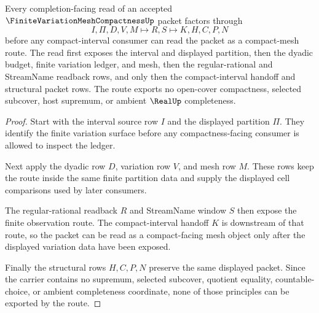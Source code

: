 \begin{theorem}
\label{thm:finite-variation-mesh-compactness-l10-route}
Every completion-facing read of an accepted $\FiniteVariationMeshCompactnessUp$ packet factors through
$$
I,\Pi,D,V,M \longmapsto R,S \longmapsto K,H,C,P,N
$$
before any compact-interval consumer can read the packet as a compact-mesh route. The read first exposes the interval and displayed partition, then the dyadic budget, finite variation ledger, and mesh, then the regular-rational and StreamName readback rows, and only then the compact-interval handoff and structural packet rows. The route exports no open-cover compactness, selected subcover, host supremum, or ambient $\RealUp$ completeness.
\end{theorem}
\begin{proof}
Start with the interval source row $I$ and the displayed partition $\Pi$. They identify the finite variation surface before any compactness-facing consumer is allowed to inspect the ledger.

Next apply the dyadic row $D$, variation row $V$, and mesh row $M$. These rows keep the route inside the same finite partition data and supply the displayed cell comparisons used by later consumers.

The regular-rational readback $R$ and StreamName window $S$ then expose the finite observation route. The compact-interval handoff $K$ is downstream of that route, so the packet can be read as a compact-facing mesh object only after the displayed variation data have been exposed.

Finally the structural rows $H,C,P,N$ preserve the same displayed packet. Since the carrier contains no supremum, selected subcover, quotient equality, countable-choice, or ambient completeness coordinate, none of those principles can be exported by the route.
\end{proof}

